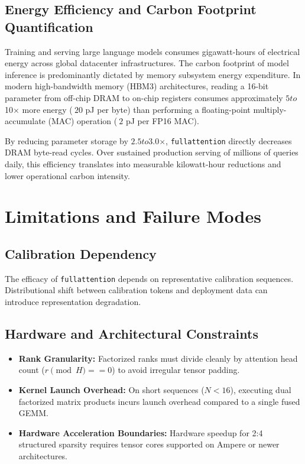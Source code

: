 {\subsection{Energy Efficiency and Carbon Footprint Quantification}
Training and serving large language models consumes gigawatt-hours of electrical energy across global datacenter infrastructures. The carbon footprint of model inference is predominantly dictated by memory subsystem energy expenditure. In modern high-bandwidth memory (HBM3) architectures, reading a 16-bit parameter from off-chip DRAM to on-chip registers consumes approximately $5$\times$ to $10$\times$ more energy ($~20$ pJ per byte) than performing a floating-point multiply-accumulate (MAC) operation ($~2$ pJ per FP16 MAC).

By reducing parameter storage by $2.5$\times$ to $3.0$\times$, \texttt{fullattention} directly decreases DRAM byte-read cycles. Over sustained production serving of millions of queries daily, this efficiency translates into measurable kilowatt-hour reductions and lower operational carbon intensity.


\section{Limitations and Failure Modes}

\subsection{Calibration Dependency}
The efficacy of \texttt{fullattention} depends on representative calibration sequences. Distributional shift between calibration tokens and deployment data can introduce representation degradation.

\subsection{Hardware and Architectural Constraints}
\begin{itemize}
\item \textbf{Rank Granularity:} Factorized ranks must divide cleanly by attention head count ($r \pmod H == 0$) to avoid irregular tensor padding.
\item \textbf{Kernel Launch Overhead:} On short sequences ($N < 16$), executing dual factorized matrix products incurs launch overhead compared to a single fused GEMM.
\item \textbf{Hardware Acceleration Boundaries:} Hardware speedup for 2:4 structured sparsity requires tensor cores supported on Ampere or newer architectures.
\end{itemize}

}
